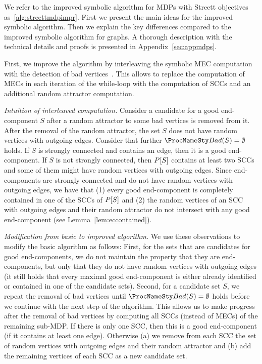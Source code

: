 \smallskip{}
We refer to the improved symbolic algorithm for MDPs with Streett objectives as~\ref{alg:streettmdpimpr}.
First we present the main ideas for the improved symbolic algorithm. Then we explain
the key differences compared to the improved symbolic algorithm for graphs. A thorough description
with the technical details and proofs is presented in Appendix~\ref{sec:appmdps}.
\begin{compactitem}
\item First, we improve the algorithm by interleaving the symbolic MEC computation with the detection
of bad vertices~\cite{ChatterjeeDHL16,Loitzenbauer16}. This allows to replace the
computation of MECs in each iteration of the while-loop with the
computation of SCCs and an additional random attractor computation.
\begin{compactitem}
\item {\em Intuition of interleaved computation.}
Consider a candidate for a good end-component $S$ after a random attractor
to some bad vertices is removed from it. After the removal of the random attractor,
the set $S$ does not have random vertices with outgoing edges. Consider that further $\bad(S) = \emptyset$ holds.
If $S$ is strongly connected and contains an edge, then it is a good end-component.
If $S$ is not strongly connected, then $P[S]$ contains at least two SCCs and some
of them might have random vertices with outgoing edges. Since end-components are strongly connected and
do not have random vertices with outgoing edges, we have that (1) every good end-component is completely
contained in one of the SCCs of $P[S]$ and (2) the random vertices of an SCC with outgoing edges
and their random attractor do not intersect with any good end-component (see Lemma~\ref{lem:eccontained}).
\item {\em Modification from basic to improved algorithm.}
We use these observations to modify the basic algorithm as follows:
First, for the sets that are candidates for good end-components, we do not maintain the property
that they are end-components, but only that they do not have random vertices with outgoing edges
(it still holds that every maximal good end-component is either already identified or 
contained in one of the candidate sets). Second, for a candidate set $S$, we repeat the removal of 
bad vertices until $\bad(S) = \emptyset$ holds before we continue with the 
next step of the algorithm. This allows us to make progress after the removal of bad vertices
by computing all SCCs (instead of MECs) of the remaining sub-MDP.
If there is only one SCC, then this is a good end-component (if it contains 
at least one edge). Otherwise (a) we remove from each SCC
the set of random vertices with outgoing edges and their random attractor
and (b) add the remaining vertices of each SCC as a new candidate set.


\end{compactitem}
\end{compactitem}
